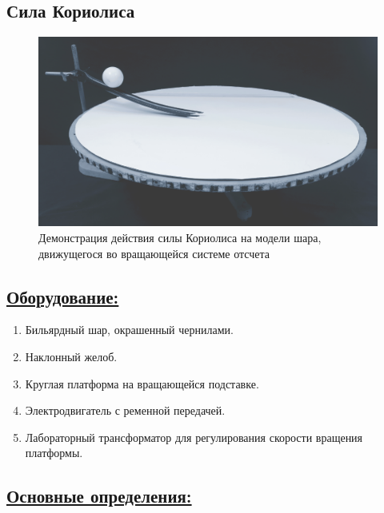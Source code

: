 \documentclass[14pt,a4paper,oneside]{extarticle}	%
\begin{document}
	

	\begin{center}
		\subsection*{Сила Кориолиса}
	\end{center}	

\begin{figure}[H] 	
	\centering 	
	\includegraphics[width=0.9\linewidth]{Coriolis-1.png}
	\caption{Демонстрация действия силы Кориолиса на модели шара, движущегося во вращающейся системе отсчета}
	\label{Coriolis-1}
\end{figure}
	
	\subsection*{\underline{Оборудование:}}

		\begin{enumerate}
			\item Бильярдный шар, окрашенный чернилами.
			\item Наклонный желоб.
			\item Круглая платформа на вращающейся подставке.
			\item Электродвигатель с ременной передачей.
			\item Лабораторный трансформатор для регулирования скорости вращения платформы.
		\end{enumerate}

		\subsection*{\underline{Основные определения:}}
		
\end{document}
